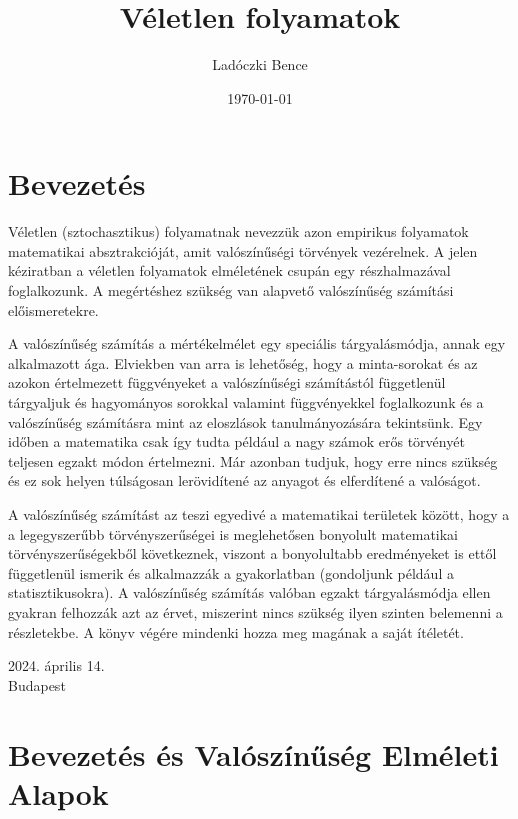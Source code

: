 \documentclass{article}
\begin{document}
\title{Véletlen folyamatok}
\author{Ladóczki Bence}
\date{\today}

\maketitle

\section{Bevezetés}

Véletlen (sztochasztikus) folyamatnak nevezzük azon empirikus folyamatok matematikai absztrakcióját, amit valószínűségi törvények vezérelnek. A jelen kéziratban a véletlen folyamatok elméletének csupán egy részhalmazával foglalkozunk. A megértéshez szükség van alapvető valószínűség számítási előismeretekre. 

A valószínűség számítás a mértékelmélet egy speciális tárgyalásmódja, annak egy alkalmazott ága. Elviekben van arra is lehetőség, hogy a minta-sorokat és az azokon értelmezett függvényeket a valószínűségi számítástól függetlenül tárgyaljuk és hagyományos sorokkal valamint függvényekkel foglalkozunk és a valószínűség számításra mint az eloszlások tanulmányozására tekintsünk. Egy időben a matematika csak így tudta például a nagy számok erős törvényét teljesen egzakt módon értelmezni. Már azonban tudjuk, hogy erre nincs szükség és ez sok helyen túlságosan lerövidítené az anyagot és elferdítené a valóságot. 

A valószínűség számítást az teszi egyedivé a matematikai területek között, hogy a a legegyszerűbb törvényszerűségei is meglehetősen bonyolult matematikai törvényszerűségekből következnek, viszont a bonyolultabb eredményeket is ettől függetlenül ismerik és alkalmazzák a gyakorlatban (gondoljunk például a statisztikusokra). A valószínűség számítás valóban egzakt tárgyalásmódja ellen gyakran felhozzák azt az érvet, miszerint nincs szükség ilyen szinten belemenni a részletekbe. A könyv végére mindenki hozza meg magának a saját ítéletét.

\begin{flushright}
2024. április 14. \\ Budapest
\end{flushright}

\section{Bevezetés és Valószínűség Elméleti Alapok}
\end{document}

